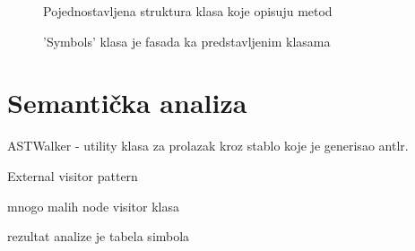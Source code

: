 \begin{figure}[h]
	\centering
	
	\caption{Pojednostavljena struktura klasa koje opisuju metod}
\end{figure}

\begin{figure}[h]
	\centering
	
	\caption{'Symbols' klasa je fasada ka predstavljenim klasama}
\end{figure}

\section{Semantička analiza}

ASTWalker - utility klasa za prolazak kroz stablo koje je generisao antlr.

External visitor pattern

mnogo malih node visitor klasa

rezultat analize je tabela simbola

